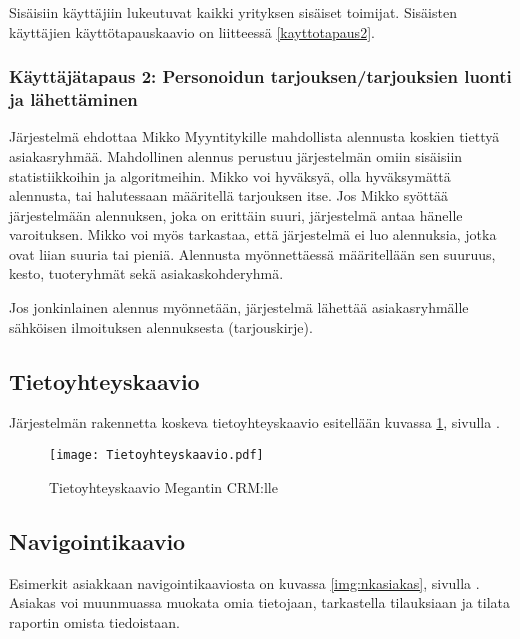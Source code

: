     Sisäisiin käyttäjiin lukeutuvat kaikki yrityksen sisäiset toimijat. Sisäisten käyttäjien käyttötapauskaavio on liitteessä \ref{kayttotapaus2}. 

\subsubsection{Käyttäjätapaus 2: Personoidun tarjouksen/tarjouksien luonti ja lähet\-täminen}     %

    Järjestelmä ehdottaa Mikko Myyntitykille mahdollista alennusta koskien tiettyä asiakasryhmää.
    Mahdollinen alennus perustuu järjestelmän omiin sisäisiin statistiikkoihin ja algoritmeihin.
    Mikko voi hyväksyä, olla hyväksymättä alennusta, tai halutessaan määritellä tarjouksen itse.
    Jos Mikko syöttää järjestelmään alennuksen, joka on erittäin suuri, järjestelmä antaa hänelle varoituksen.
    Mikko voi myös tarkastaa, että järjestelmä ei luo alennuksia, jotka ovat liian suuria tai pieniä.
    Alennusta myönnettäessä määritellään sen suuruus, kesto, tuoteryhmät sekä asiakaskohderyhmä.

    Jos jonkinlainen alennus myönnetään, järjestelmä lähettää asiakasryhmälle sähköisen ilmoituksen alennuksesta (tarjouskirje).

\subsection{Tietoyhteyskaavio}   %

    Järjestelmän rakennetta koskeva tietoyhteyskaavio esitellään kuvassa \ref{img:tietoyhteyskaavio}, sivulla \pageref{img:tietoyhteyskaavio}.

    \begin{figure}[h]
        \texttt{[image: Tietoyhteyskaavio.pdf]}
        \caption{Tietoyhteyskaavio Megantin CRM:lle}
        \label{img:tietoyhteyskaavio}
    \end{figure}

    \pagebreak

\subsection{Navigointikaavio}     %
    
    Esimerkit asiakkaan navigointikaaviosta on kuvassa \ref{img:nkasiakas}, sivulla \pageref{img:nkasiakas}. Asiakas voi muunmuassa muokata omia tietojaan, tarkastella tilauksiaan ja tilata raportin omista tiedoistaan.

